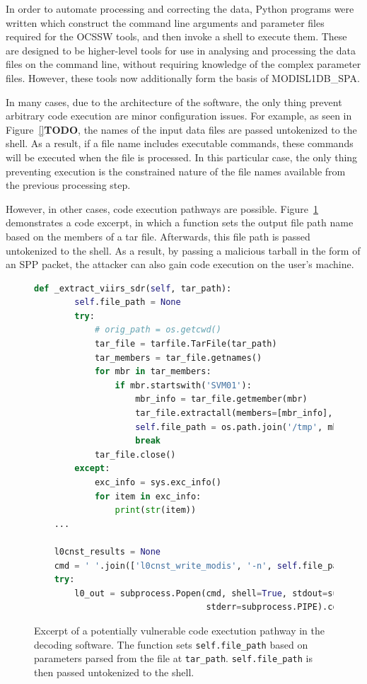 In order to automate processing and correcting the data, Python programs were written which construct the command line arguments and parameter files required for the OCSSW tools, and then invoke a shell to execute them.
These are designed to be higher-level tools for use in analysing and processing the data files on the command line, without requiring knowledge of the complex parameter files.
However, these tools now additionally form the basis of MODISL1DB\_SPA.

In many cases, due to the architecture of the software, the only thing prevent arbitrary code execution are minor configuration issues.
For example, as seen in Figure~\ref{}\textbf{TODO}, the names of the input data files are passed untokenized to the shell.
As a result, if a file name includes executable commands, these commands will be executed when the file is processed.
In this particular case, the only thing preventing execution is the constrained nature of the file names available from the previous processing step.

However, in other cases, code execution pathways are possible.
Figure~\ref{fig:code-execution} demonstrates a code excerpt, in which a function sets the output file path name based on the members of a tar file.
Afterwards, this file path is passed untokenized to the shell.
As a result, by passing a malicious tarball in the form of an SPP packet, the attacker can also gain code execution on the user's machine.

\begin{figure}
    \centering
    \begin{lstlisting}[language=Python]
    def _extract_viirs_sdr(self, tar_path):
        self.file_path = None
        try:
            # orig_path = os.getcwd()
            tar_file = tarfile.TarFile(tar_path)
            tar_members = tar_file.getnames()
            for mbr in tar_members:
                if mbr.startswith('SVM01'):
                    mbr_info = tar_file.getmember(mbr)
                    tar_file.extractall(members=[mbr_info], path='/tmp')
                    self.file_path = os.path.join('/tmp', mbr)
                    break
            tar_file.close()
        except:
            exc_info = sys.exc_info()
            for item in exc_info:
                print(str(item))
    ...

    l0cnst_results = None
    cmd = ' '.join(['l0cnst_write_modis', '-n', self.file_path])
    try:
        l0_out = subprocess.Popen(cmd, shell=True, stdout=subprocess.PIPE,
                                  stderr=subprocess.PIPE).communicate()[0]
    \end{lstlisting}
    \caption{Excerpt of a potentially vulnerable code exectution pathway in the decoding software. The function sets \texttt{self.file\_path} based on parameters parsed from the file at \texttt{tar\_path}. \texttt{self.file\_path} is then passed untokenized to the shell.}
    \label{fig:code-execution}
\end{figure}

